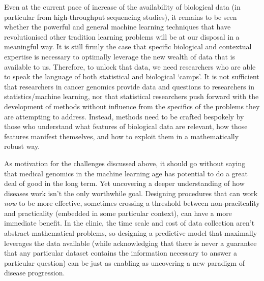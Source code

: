 \documentclass[thesis.tex]{subfiles}
\begin{document}
Even at the current pace of increase of the availability of biological data (in particular from high-throughput sequencing studies), it remains to be seen whether the powerful and general machine learning techniques that have revolutionised other tradition learning problems will be at our disposal in a meaningful way. It is still firmly the case that specific biological and contextual expertise is necessary to optimally leverage the new wealth of data that is available to us. Therefore, to unlock that data, we need researchers who are able to speak the language of both statistical and biological `camps'. It is not sufficient that researchers in cancer genomics provide data and questions to researchers in statistics/machine learning, nor that statistical researchers push forward with the development of methods without influence from the specifics of the problems they are attempting to address. Instead, methods need to be crafted bespokely by those who understand what features of biological data are relevant, how those features manifest themselves, and how to exploit them in a mathematically robust way. 

As motivation for the challenges discussed above, it should go without saying that medical genomics in the machine learning age has potential to do a great deal of good in the long term. Yet uncovering a deeper understanding of how diseases work isn't the only worthwhile goal. Designing procedures that can work \textit{now} to be more effective, sometimes crossing a threshold between non-pracitcality and practicality (embedded in some particular context), can have a more immediate benefit. In the clinic, the time scale and cost of data collection aren't abstract mathematical problems, so designing a predictive model that maximally leverages the data available (while acknowledging that there is never a guarantee that any particular dataset contains the information necessary to answer a particular question) can be just as enabling as uncovering a new paradigm of disease progression. 
\end{document}

